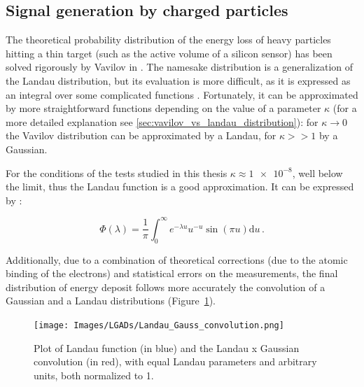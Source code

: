 \subsection{Signal generation by charged particles}\label{subsec:charged_particles_distribution}
The theoretical probability distribution of the energy loss of heavy particles hitting a thin target (such as the active volume of a silicon sensor) has been solved rigorously by Vavilov in \cite{vavilov_1957}. The namesake distribution is a generalization of the Landau distribution, but its evaluation is more difficult, as it is expressed as an integral over some complicated functions \cite[Eq.(4)]{vavilov_1957}. Fortunately, it can be approximated by more straightforward functions depending on the value of a parameter \(\kappa\) (for a more detailed explanation see \ref{sec:vavilov_vs_landau_distribution}): for \(\kappa\rightarrow0\) the Vavilov distribution can be approximated by a Landau, for \(\kappa>>1\) by a Gaussian.

For the conditions of the tests studied in this thesis \(\kappa\approx \num{1e-8}\), well below the limit, thus the Landau function is a good approximation. It can be expressed by \cite{KOLBIG198497}:

\begin{equation}\label{eq:landau}
    \Phi (\lambda) = \frac{1}{\pi} \int_{0}^{\infty} e^{-\lambda u} u^{-u} \sin (\pi u ) \mathrm{d}u \, .
\end{equation}

Additionally, due to a combination of theoretical corrections \cite{PhysRevA.11.1286} (due to the atomic binding of the electrons) and statistical errors on the measurements, the final distribution of energy deposit follows more accurately the convolution of a Gaussian and a Landau distributions (Figure~\ref{fig:langau_convolution_plot}).

\begin{figure}
    \centering
    \texttt{[image: Images/LGADs/Landau\_Gauss\_convolution.png]}
    \captionsetup{width=\captionwidth}
    \caption{Plot of Landau function (in blue) and the Landau x Gaussian convolution (in red), with equal Landau parameters and arbitrary units, both normalized to 1.}
    \label{fig:langau_convolution_plot}
\end{figure}

